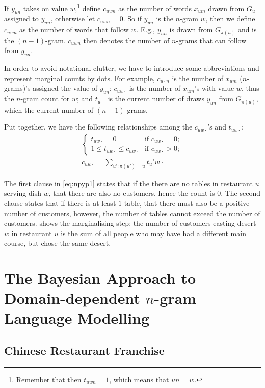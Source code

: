 If $y_{un}$ takes on value $w$,\footnote{Remember that then $t_{uwn}=1$, which means that $un=w$.} define $c_{uwn}$ as the number of words $x_{um}$ drawn from $G_u$ assigned to $y_{un}$, otherwise let $c_{uwn} = 0$. So if $y_{un}$ is the $n$-gram $w$, then we define $c_{uwn}$ as the number of words that follow $w$. E.g., $y_{un}$ is drawn from $G_{\pi(u)}$ and is the $(n-1)$-gram. $c_{uwn}$ then denotes the number of $n$-grams that can follow from $y_{un}$.

In order to avoid notational clutter, we have to introduce some abbreviations and represent marginal counts by dots. For example, $c_{u\cdot n}$ is the number of $x_{um}$ ($n$-grams)'s assigned the value of $y_{un}$; $c_{uw\cdot}$ is the number of $x_{um}$'s with value $w$, thus the $n$-gram count for $w$; and $t_{u\cdot\cdot}$ is the current number of draws $y_{un}$ from $G_{\pi(u)}$, which the current number of $(n-1)$-grams.

Put together, we have the following relationships among the $c_{uw\cdot}$'s and $t_{uw\cdot}$:
\begin{align}
	\begin{cases}
    	t_{uw\cdot} = 0 & \text{if }c_{uw\cdot}=0;\\
        1\leq t_{uw\cdot}\leq c_{uw\cdot} & \text{if }c_{uw\cdot} > 0;
    \end{cases} \label{eq:npyp1}\\
    c_{uw\cdot} = \sum_{u':\pi(u')=u} t_u'w\cdot\label{eq:npyp2}
\end{align}

The first clause in \cref{eq:npyp1} states that if the there are no tables in restaurant $u$ serving dish $w$, that there are also no customers, hence the count is $0$. The second clause states that if there is at least $1$ table, that there must also be a positive number of customers, however, the number of tables cannot exceed the number of customers.
 shows the marginalising step: the number of customers easting desert $w$ in restaurant $u$ is the sum of all people who may have had a different main course, but chose the same desert.



\section{The Bayesian Approach to Domain-dependent $n$-gram Language Modelling}

\subsection{Chinese Restaurant Franchise}

